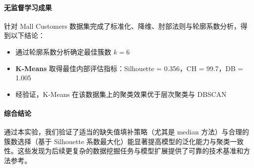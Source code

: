 \documentclass[UTF8]{ctexart}
\begin{document}
\paragraph{无监督学习成果}
针对 Mall Customers 数据集完成了标准化、降维、肘部法则与轮廓系数分析，得到以下结论：
\begin{itemize}
    \item 通过轮廓系数分析确定最佳簇数 $k=6$
    \item \textbf{K-Means} 取得最佳内部评估指标：Silhouette = \num{0.356}，CH = \num{99.7}，DB = \num{1.005}
    \item 经验证，K-Means 在该数据集上的聚类效果优于层次聚类与 DBSCAN
\end{itemize}

\paragraph{综合结论}
通过本实验，我们验证了适当的缺失值填补策略（尤其是 median 方法）与合理的簇数选择（基于 Silhouette 系数最大化）能显著提高模型的泛化能力与聚类一致性。这些发现为后续更复杂的数据挖掘任务与模型扩展提供了可靠的技术基准和方法参考。
\end{document}

